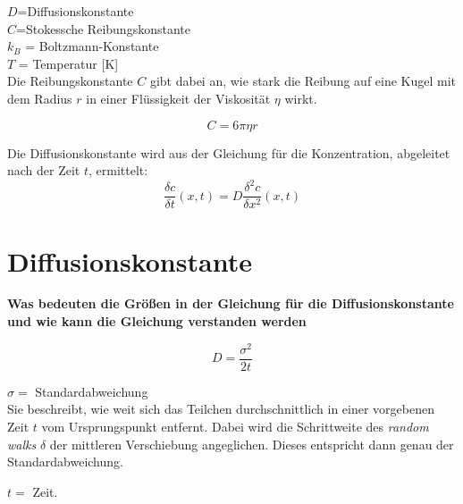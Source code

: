 \documentclass[a4paper, 12pt]{article}
\begin{document}
\noindent $D$=Diffusionskonstante\\
\noindent $C$=Stokessche Reibungskonstante\\
\noindent $k_B$ = Boltzmann-Konstante\\
\noindent $T$ = Temperatur [K]\\

Die Reibungskonstante $C$ gibt dabei an, wie stark die Reibung auf eine Kugel mit dem Radius $r$ in einer Flüssigkeit der Viskosität $\eta$ wirkt. 

\begin{equation}
C = 6\pi\eta r
\end{equation}

Die Diffusionskonstante wird aus der Gleichung für die Konzentration, abgeleitet nach der Zeit $t$, ermittelt:
\begin{equation}
\frac{\delta c}{\delta t}(x,t) = D \frac{\delta^2 c}{\delta x^2}(x,t)
\end{equation}

\section{Diffusionskonstante}
\textbf{Was bedeuten die Größen in der Gleichung für die Diffusionskonstante und wie kann die Gleichung verstanden werden}

\begin{equation}
D= \frac{\sigma^2}{2t}
\end{equation}

\noindent $\sigma =$ Standardabweichung\\
Sie beschreibt, wie weit sich das Teilchen durchschnittlich in einer vorgebenen Zeit $t$ vom Ursprungspunkt entfernt. Dabei wird die Schrittweite des \textit{random walks} $\delta$ der mittleren Verschiebung angeglichen. Dieses entspricht dann genau der Standardabweichung.

\noindent $t =$ Zeit.
\end{document}
